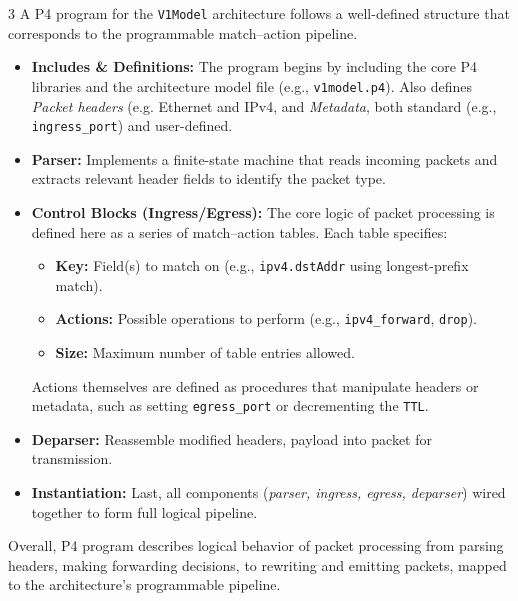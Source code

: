 \documentclass[a4paper, 9pt, landscape]{article}
\begin{document}
\begin{multicols*}{3}
A P4 program for the \texttt{V1Model} architecture follows a well-defined structure that corresponds to the programmable match--action pipeline.

\begin{itemize}
  \item \textbf{Includes \& Definitions:}  
  The program begins by including the core P4 libraries and the architecture model file (e.g., \texttt{v1model.p4}).  Also defines \textit{Packet headers} (e.g. Ethernet and IPv4, and \textit{Metadata}, both standard (e.g., \texttt{ingress\_port}) and user-defined.
    \item \textbf{Parser:} Implements a finite-state machine that reads incoming packets and extracts relevant header fields to identify the packet type.
  \item \textbf{Control Blocks (Ingress/Egress):}  
  The core logic of packet processing is defined here as a series of match--action tables.
  Each table specifies:
  \begin{itemize}
    \item \textbf{Key:} Field(s) to match on (e.g., \texttt{ipv4.dstAddr} using longest-prefix match).
    \item \textbf{Actions:} Possible operations to perform (e.g., \texttt{ipv4\_forward}, \texttt{drop}).
    \item \textbf{Size:} Maximum number of table entries allowed.
  \end{itemize}
  Actions themselves are defined as procedures that manipulate headers or metadata, such as setting \texttt{egress\_port} or decrementing the \texttt{TTL}.

  \item \textbf{Deparser:}  Reassemble modified headers, payload into packet for transmission.
  \item \textbf{Instantiation:}  Last, all components (\textit{parser, ingress, egress, deparser}) wired together to form full logical pipeline. 
\end{itemize}

\noindent
Overall, P4 program describes logical behavior of packet processing from parsing headers, making forwarding decisions, to rewriting and emitting packets, mapped to the architecture’s programmable pipeline.




\end{multicols*}
\end{document}
